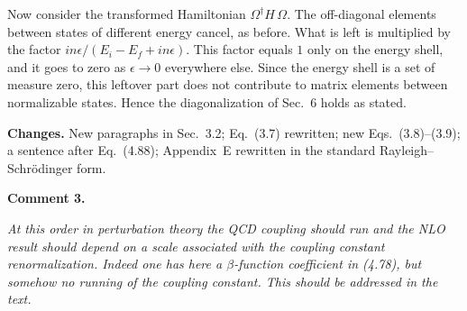 \documentclass[11pt,a4paper]{article}
\newenvironment{comment}[1]{\par\medskip\noindent\textbf{Comment #1.}\par\vspace{2pt}%
  \begin{list}{}{\leftmargin=12pt\rightmargin=12pt}\item\itshape\small}{\end{list}\vspace{-2pt}}
\newcommand{\changes}{\par\noindent\textbf{Changes.} }
\begin{document}
Now consider the transformed Hamiltonian $\Omega^{\dagger}H\,\Omega$. The off-diagonal elements between states of different energy cancel, as before. What is left is multiplied by the factor $in\epsilon/(E_{i}-E_{f}+in\epsilon)$. This factor equals $1$ only on the energy shell, and it goes to zero as $\epsilon\to0$ everywhere else. Since the energy shell is a set of measure zero, this leftover part does not contribute to matrix elements between normalizable states. Hence the diagonalization of Sec.~6 holds as stated.

\changes New paragraphs in Sec.~3.2; Eq.~(3.7) rewritten; new Eqs.~(3.8)--(3.9); a sentence after Eq.~(4.88); Appendix~E rewritten in the standard Rayleigh--Schr\"odinger form.

\begin{comment}{3}
At this order in perturbation theory the QCD coupling should run and the NLO result should depend on a scale associated with the coupling constant renormalization. Indeed one has here a $\beta$-function coefficient in (4.78), but somehow no running of the coupling constant. This should be addressed in the text.
\end{comment}
\end{document}
